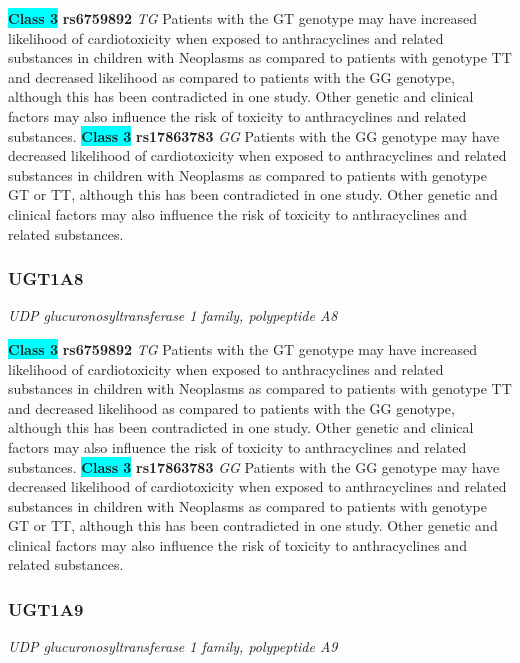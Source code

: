 \documentclass{report}
\begin{document}
\textbf{\colorbox{cyan} {Class 3}} \textbf{ rs6759892 } \textit{ TG }
Patients with the GT genotype may have increased likelihood of cardiotoxicity when exposed to anthracyclines and related substances in children with Neoplasms as compared to patients with genotype TT and decreased likelihood as compared to patients with the GG genotype, although this has been contradicted in one study. Other genetic and clinical factors may also influence the risk of toxicity to anthracyclines and related substances. \newline\textbf{\colorbox{cyan} {Class 3}} \textbf{ rs17863783 } \textit{ GG }
Patients with the GG genotype may have decreased likelihood of cardiotoxicity when exposed to anthracyclines and related substances in children with Neoplasms as compared to patients with genotype GT or TT, although this has been contradicted in one study. Other genetic and clinical factors may also influence the risk of toxicity to anthracyclines and related substances.
\newline\subsubsection{ UGT1A8 }
\textit{ UDP glucuronosyltransferase 1 family, polypeptide A8 }

\textbf{\colorbox{cyan} {Class 3}} \textbf{ rs6759892 } \textit{ TG }
Patients with the GT genotype may have increased likelihood of cardiotoxicity when exposed to anthracyclines and related substances in children with Neoplasms as compared to patients with genotype TT and decreased likelihood as compared to patients with the GG genotype, although this has been contradicted in one study. Other genetic and clinical factors may also influence the risk of toxicity to anthracyclines and related substances. \newline\textbf{\colorbox{cyan} {Class 3}} \textbf{ rs17863783 } \textit{ GG }
Patients with the GG genotype may have decreased likelihood of cardiotoxicity when exposed to anthracyclines and related substances in children with Neoplasms as compared to patients with genotype GT or TT, although this has been contradicted in one study. Other genetic and clinical factors may also influence the risk of toxicity to anthracyclines and related substances.
\newline\subsubsection{ UGT1A9 }
\textit{ UDP glucuronosyltransferase 1 family, polypeptide A9 }
\end{document}
